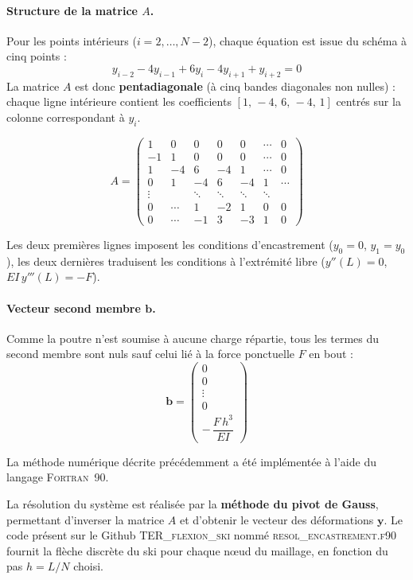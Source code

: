 \documentclass[12pt, a4paper]{article}
\begin{document}
\paragraph{Structure de la matrice $A$.}
Pour les points intérieurs ($i=2,\dots,N-2$), chaque équation est issue du schéma à cinq points :
\[
y_{i-2} - 4y_{i-1} + 6y_i - 4y_{i+1} + y_{i+2} = 0
\]
La matrice $A$ est donc \textbf{pentadiagonale} (à cinq bandes diagonales non nulles) : chaque ligne intérieure contient les coefficients $[1,\,-4,\,6,\,-4,\,1]$ centrés sur la colonne correspondant à $y_i$.

\[
A =
\begin{pmatrix}
1 & 0 & 0 & 0 & 0 & \cdots & 0 \\[3pt]
-1 & 1 & 0 & 0 & 0 & \cdots & 0 \\[3pt]
1 & -4 & 6 & -4 & 1 & \cdots & 0 \\[3pt]
0 & 1 & -4 & 6 & -4 & 1 & \cdots \\[3pt]
\vdots & & \ddots & \ddots & \ddots & \ddots & \\[3pt]
0 & \cdots & 1 & -2 & 1 & 0 & 0 \\[3pt]
0 & \cdots & -1 & 3 & -3 & 1 & 0
\end{pmatrix}
\]

Les deux premières lignes imposent les conditions d’encastrement
($y_0=0$, $y_1=y_0$),  
les deux dernières traduisent les conditions à l’extrémité libre
($y''(L)=0$, $EI\,y'''(L)=-F$).

\paragraph{Vecteur second membre $\mathbf{b}$.}
Comme la poutre n’est soumise à aucune charge répartie, tous les termes du second membre sont nuls sauf celui lié à la force ponctuelle $F$ en bout :
\[
\mathbf{b} =
\begin{pmatrix}
0 \\ 0 \\ \vdots \\ 0 \\[2pt] -\,\dfrac{F\,h^3}{EI}
\end{pmatrix}
\]

La méthode numérique décrite précédemment a été implémentée à l’aide du langage \textsc{Fortran}~90.  

La résolution du système est réalisée par la \textbf{méthode du pivot de Gauss}, permettant d’inverser la matrice $A$ et d’obtenir le vecteur des déformations $\mathbf{y}$.  
Le code présent sur le Github \textsc{TER\_flexion\_ski} nommé \textsc{resol\_encastrement.f90} fournit la flèche discrète du ski pour chaque nœud du maillage, en fonction du pas $h = L/N$ choisi.
\end{document}
